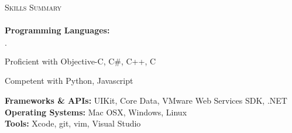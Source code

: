 \documentclass[11pt]{article}
\newcommand{\mydot}{$\cdot$ }
\newcommand{\lineunder}{\vspace*{-8pt} \\ \hspace*{-18pt} \hrulefill \\}
\newcommand{\header}[1]{{\hspace*{-15pt}\vspace*{6pt} \textsc{#1}} \vspace*{-6pt} \lineunder}
\newenvironment{achievements}{\begin{list}{\mydot}{\topsep 0pt \itemsep -2pt}}{\vspace*{4pt}\end{list}}
\begin{document}

\header{Skills Summary}
\textbf{Programming Languages:} 
\begin{achievements}
  \item Proficient with Objective-C, C\#, C++, C
  \item Competent with Python, Javascript
\end{achievements}
\vspace{-3pt}

\textbf{Frameworks \& APIs:} UIKit, Core Data, VMware Web Services SDK, .NET\\

\textbf{Operating Systems:} Mac OSX, Windows, Linux\\

\textbf{Tools:} Xcode, git, vim, Visual Studio\\
\end{document}
